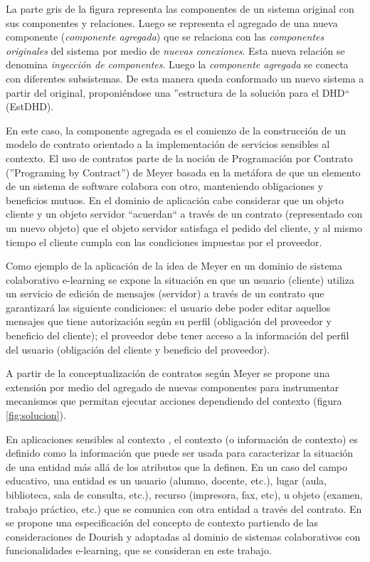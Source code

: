 La parte gris de la figura representa las componentes de un sistema original
con sus componentes y relaciones. Luego se representa el agregado de una nueva
componente (\textit{componente agregada}) que se relaciona con las
\textit{componentes originales} del sistema por medio de \textit{nuevas
conexiones}. Esta nueva relación se denomina \textit{inyección de componentes}.
Luego la \textit{componente agregada} se conecta con diferentes subsistemas. De
esta manera queda conformado un nuevo sistema a partir del
original, proponiéndose una ''estructura de la solución para
el DHD`` (EstDHD).

En este caso, la componente agregada es el comienzo de la
construcción de un modelo de contrato orientado a la implementación de servicios
sensibles al contexto. El uso de contratos parte de la noción de Programación
por Contrato (”Programing by Contract”) de Meyer \cite{cap1.11} basada en la
metáfora de que un elemento de un sistema de software colabora con otro,
manteniendo obligaciones y beneficios mutuos. En el dominio de aplicación cabe
considerar que un objeto cliente y un objeto servidor “acuerdan“ a través de
un contrato (representado con un nuevo objeto) que el objeto servidor satisfaga
el pedido del cliente, y al mismo tiempo el cliente cumpla con las condiciones
impuestas por el proveedor.

Como ejemplo de la aplicación de la idea de Meyer en un dominio de
sistema colaborativo e-learning se expone la situación en que un
usuario (cliente) utiliza un servicio de edición de mensajes (servidor) a través
de un contrato que garantizará las siguiente condiciones: el usuario debe poder
editar aquellos mensajes que tiene autorización según su perfil (obligación del
proveedor y beneficio del cliente); el proveedor debe tener acceso a la
información del perfil del usuario (obligación del cliente y beneficio del
proveedor).

A partir de la conceptualización de contratos según Meyer se propone una
extensión por medio del agregado de nuevas componentes para instrumentar
mecanismos que permitan ejecutar acciones dependiendo del contexto (figura
\ref{fig:solucion}).

En aplicaciones sensibles al contexto \cite{cap1.6}, el contexto (o información
de contexto) es definido como la información que puede ser usada
para caracterizar la situación de una entidad más allá de los atributos que la
definen. En un caso del campo educativo, una entidad es un usuario (alumno, docente, etc.),
lugar (aula, biblioteca, sala de consulta, etc.), recurso (impresora, fax, etc),
u objeto (examen, trabajo práctico, etc.) que se comunica con otra entidad a
través del contrato. En \cite{cap1.2} se propone una especificación del concepto
de contexto partiendo de las consideraciones de Dourish \cite{cap1.20} y
adaptadas al dominio de sistemas colaborativos con funcionalidades e-learning,
que se consideran en este trabajo.

